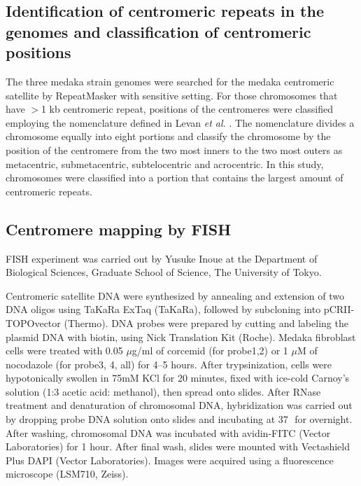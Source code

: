 \subsection*{Identification of centromeric repeats in the genomes and classification of centromeric positions}
  The three medaka strain genomes were searched for the medaka centromeric satellite by RepeatMasker with sensitive setting. For those chromosomes that have $>$1 kb centromeric repeat, positions of the centromeres were classified employing the nomenclature defined in Levan \textit{et al.} \cite{Levan1964}. The nomenclature divides a chromosome equally into eight portions and classify the chromosome by the position of the centromere from the two most inners to the two most outers as metacentric, submetacentric, subtelocentric and acrocentric. In this study, chromosomes were classified into a portion that contains the largest amount of centromeric repeats.


\subsection*{Centromere mapping by FISH}
  FISH experiment was carried out by Yusuke Inoue at the Department of Biological Sciences, Graduate School of Science, The University of Tokyo.

  Centromeric satellite DNA were synthesized by annealing and extension of two DNA oligos using TaKaRa ExTaq (TaKaRa), followed by subcloning into pCR\texttrademark II-TOPO\textregistered vector (Thermo). DNA probes were prepared by cutting and labeling the plasmid DNA with biotin, using Nick Translation Kit (Roche). Medaka fibroblast cells were treated with 0.05 $\mu$g/ml of corcemid (for probe1,2) or 1 $\mu$M of nocodazole (for probe3, 4, all) for 4--5 hours. After trypsinization, cells were hypotonically swollen in 75mM KCl for 20 minutes, fixed with ice-cold Carnoy's solution (1:3 acetic acid: methanol), then spread onto slides. After RNase treatment and denaturation of chromosomal DNA, hybridization was carried out by dropping probe DNA solution onto slides and incubating at 37\,\celsius\, for overnight. After washing, chromosomal DNA was incubated with avidin-FITC (Vector Laboratories) for 1 hour. After final wash, slides were mounted with Vectashield Plus DAPI (Vector Laboratories). Images were acquired using a fluorescence microscope (LSM710, Zeiss).


